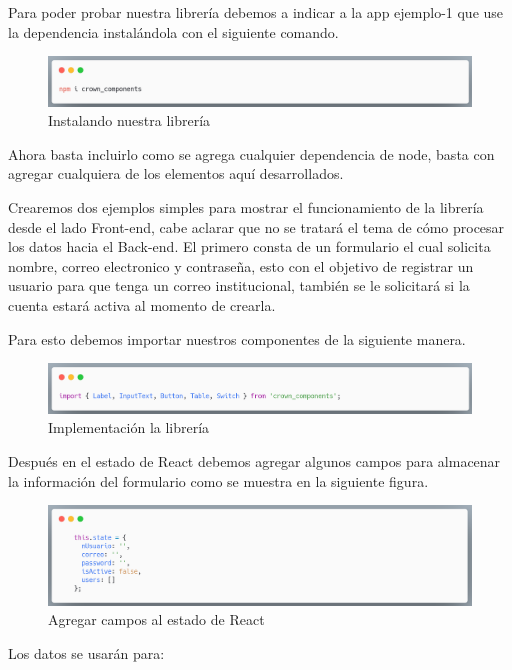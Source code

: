 Para poder probar nuestra librería debemos a indicar a la app ejemplo-1 que use la dependencia instalándola con el siguiente comando.\newline
\newline
\begin{figure}[H]
    \includegraphics[width=1\textwidth]{./Imagenes/9.4}
   \centering 
    \caption[Instalando nuestra librería]{Instalando nuestra librería}
    \end{figure}
\newline

Ahora basta incluirlo como se agrega cualquier dependencia de node, basta con agregar cualquiera de los elementos aquí desarrollados. 

Crearemos dos ejemplos simples para mostrar el funcionamiento de la librería desde el lado Front-end, cabe aclarar que no se tratará el tema de cómo procesar los datos hacia el Back-end.
El primero consta de un formulario el cual solicita nombre, correo electronico y contraseña, esto con el objetivo de registrar un usuario para que tenga un correo institucional, también se le solicitará si la cuenta estará activa al momento de crearla.

Para esto debemos importar nuestros componentes de la siguiente manera.
\newline
\begin{figure}[H]
    \includegraphics[width=1\textwidth]{./Imagenes/9.6}
   \centering 
    \caption[Implementación la librería]{Implementación la librería}
    \end{figure}
\newline

Después en el estado de React debemos agregar algunos campos para almacenar la información del formulario como se muestra en la siguiente figura.
\newline
\begin{figure}[H]
    \includegraphics[width=1\textwidth]{./Imagenes/9.7}
   \centering 
    \caption[Agregar campos al estado de React]{Agregar campos al estado de React}
    \end{figure}
\newline
Los datos se usarán para:

